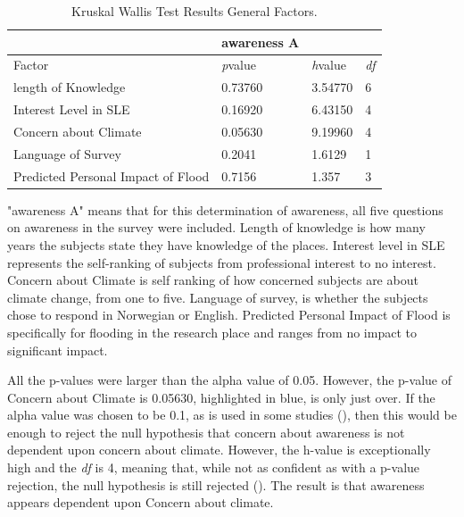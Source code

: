\begin{table}[H]
    \centering
    \begin{tabular}{|l|l|l|l|}
    \hline
         ~ & \textbf{awareness A} & ~ & ~ \\ \hline
        Factor &\textit{p}value &\textit{h}value & \textit{df} \\ \hline
           length of Knowledge & 0.73760 & 3.54770 & 6 \\ \hline
       Interest Level in SLE & 0.16920 & 6.43150 & 4 \\ \hline
        Concern about Climate & \cellcolor[HTML]{7df9ff} 0.05630 & \cellcolor[HTML]{7df9ff} 9.19960 & \cellcolor[HTML]{7df9ff} 4 \\ \hline
        Language of Survey & 0.2041 & 1.6129 & 1 \\ \hline
        Predicted Personal Impact of Flood & 0.7156 & 1.357 & 3 \\ \hline
    \end{tabular}
    \caption{Kruskal Wallis Test Results General Factors.}{ "awareness A" means that for this determination of awareness, all five questions on awareness in the survey were included. Length of knowledge is how many years the subjects state they have knowledge of the places. Interest level in SLE represents the self-ranking of subjects from professional interest to no interest. Concern about Climate is self ranking of how concerned subjects are about climate change, from one to five. Language of survey, is whether the subjects chose to respond in Norwegian or English. Predicted Personal Impact of Flood is specifically for flooding in the research place and ranges from no impact to significant impact. }
    \label{kw_test_general_factors}
\end{table}

All the p-values were larger than the alpha value of 0.05. However, the p-value of Concern about Climate is 0.05630, highlighted in blue, is only just over.  If the alpha value was chosen to be 0.1, as is used in some studies (\cite{hollander_nonparametric_2014}), then this would be enough to reject the null hypothesis that concern about awareness is not dependent upon concern about climate. However, the h-value is exceptionally high and the \textit{df} is 4, meaning that, while not as confident as with a p-value rejection, the null hypothesis is still rejected (\cite{minitab_interpret_2022}). The result is that awareness appears dependent upon Concern about climate. 
\paragraph{}


